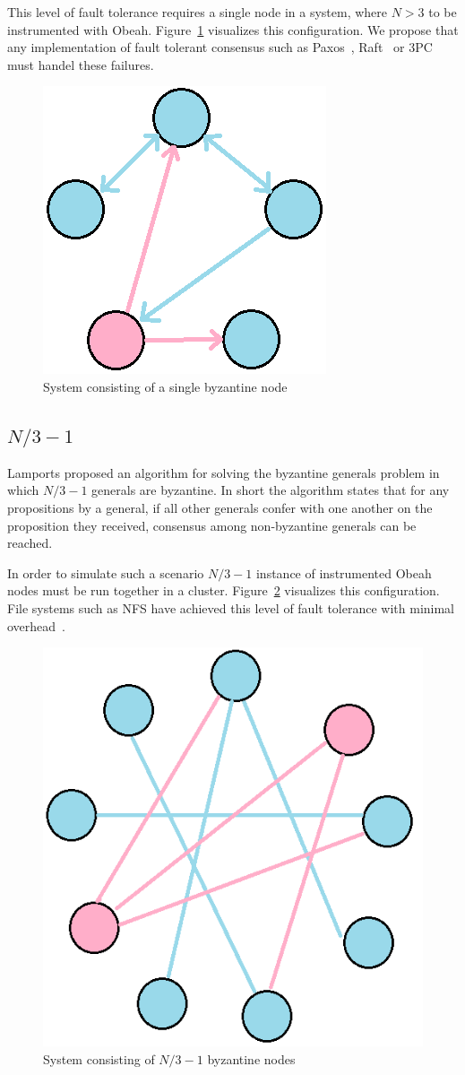 This level of fault tolerance requires a single node in a system, where $N > 3$
to be instrumented with Obeah. Figure~\ref{fig:single-byzantine} visualizes this configuration. We
propose that any implementation of fault tolerant consensus such as
Paxos~\cite{Lamport2001Paxos}, Raft~\cite{184040} or 3PC~\cite{1703048} must
handel these failures.

\begin{figure}[h]
    \centering
    \includegraphics[width=0.5\linewidth]{fig/one-byzantine}%
    \caption{System consisting of a single byzantine node\label{fig:single-byzantine}}%
\end{figure}

\subsection{$N/3 -1$}

Lamports proposed an algorithm for solving the byzantine generals problem in
which $N/3-1$ generals are byzantine. In short the algorithm states that for
any propositions by a general, if all other generals confer with one another on
the proposition they received, consensus among non-byzantine generals can be
reached.

In order to simulate such a scenario $N/3 - 1$ instance of instrumented Obeah
nodes must be run together in a cluster. Figure~\ref{fig:quarum-byzantine}
visualizes this configuration. File systems such as NFS have achieved this
level of fault tolerance with minimal
overhead~\cite{Castro:1999:PBF:296806.296824}.

\begin{figure}[h] 
    \centering
    \includegraphics[width=0.5\linewidth]{fig/quarum-byzantine}%
    \caption{System consisting of $N/3 -1$ byzantine nodes\label{fig:quarum-byzantine}}%
\end{figure}

